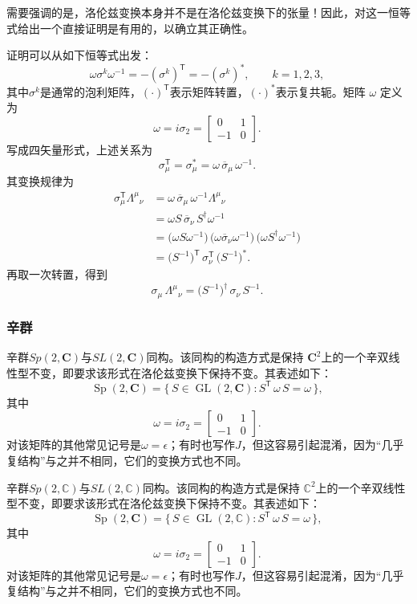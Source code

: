 需要强调的是，洛伦兹变换本身并不是在洛伦兹变换下的张量！因此，对这一恒等式给出一个直接证明是有用的，以确立其正确性。

证明可以从如下恒等式出发：
\[
\omega \sigma^{k} \omega^{-1} = -(\sigma^{k})^{\textsf{T}} = -(\sigma^{k})^{*}, \qquad k = 1,2,3,~
\]
其中$\sigma^{k}$是通常的泡利矩阵，$(\cdot)^{\textsf{T}}$表示矩阵转置，$(\cdot)^{*}$表示复共轭。矩阵 $\omega$ 定义为
\[
\omega = i\sigma_{2} =
\begin{bmatrix}
0 & 1 \\
-1 & 0
\end{bmatrix}.~
\]
写成四矢量形式，上述关系为
\[
\sigma_{\mu}^{\textsf{T}} = \sigma_{\mu}^{*} = \omega \,\overline{\sigma}_{\mu}\, \omega^{-1}.~
\]
其变换规律为
\[
\begin{aligned}
\sigma_{\mu}^{\textsf{T}} {\Lambda^{\mu}}_{\nu}
&= \omega \,\overline{\sigma}_{\mu}\, \omega^{-1} {\Lambda^{\mu}}_{\nu} \\
&= \omega S \,\overline{\sigma}_{\nu}\, S^{\dagger} \omega^{-1} \\
&= \bigl(\omega S \omega^{-1}\bigr)\, \bigl(\omega \overline{\sigma}_{\nu} \omega^{-1}\bigr)\, \bigl(\omega S^{\dagger} \omega^{-1}\bigr) \\
&= \bigl(S^{-1}\bigr)^{\textsf{T}} \,\sigma_{\nu}^{\textsf{T}}\, \bigl(S^{-1}\bigr)^{*}.
\end{aligned}~
\]
再取一次转置，得到
\[
\sigma_{\mu}\,{\Lambda^{\mu}}_{\nu} = \bigl(S^{-1}\bigr)^{\dagger}\,\sigma_{\nu}\,S^{-1}.~
\]
\subsubsection{辛群}
辛群$Sp(2,\mathbf{C})$与$SL(2,\mathbf{C})$同构。该同构的构造方式是保持 $\mathbf{C}^{2}$上的一个辛双线性型不变，即要求该形式在洛伦兹变换下保持不变。其表述如下：
\[
\operatorname{Sp}(2,\mathbf{C})
= \{\, S \in \operatorname{GL}(2,\mathbf{C}) : S^{\textsf{T}} \,\omega\, S = \omega \,\},~
\]
其中
\[
\omega = i\sigma_{2} =
\begin{bmatrix}
0 & 1 \\
-1 & 0
\end{bmatrix}.~
\]
对该矩阵的其他常见记号是$\omega = \epsilon$；有时也写作$J$，但这容易引起混淆，因为“几乎复结构”与之并不相同，它们的变换方式也不同。

辛群$Sp(2,\mathbb{C})$与$SL(2,\mathbb{C})$同构。该同构的构造方式是保持 $\mathbb{C}^{2}$上的一个辛双线性型不变，即要求该形式在洛伦兹变换下保持不变。其表述如下：
\[
\operatorname{Sp}(2,\mathbf{C})
= \{\, S \in \operatorname{GL}(2,\mathbb{C}) : S^{\textsf{T}} \,\omega\, S = \omega \,\},~
\]
其中
\[
\omega = i\sigma_{2} =
\begin{bmatrix}
0 & 1 \\
-1 & 0
\end{bmatrix}.~
\]
对该矩阵的其他常见记号是$\omega = \epsilon$；有时也写作$J$，但这容易引起混淆，因为“几乎复结构”与之并不相同，它们的变换方式也不同。

